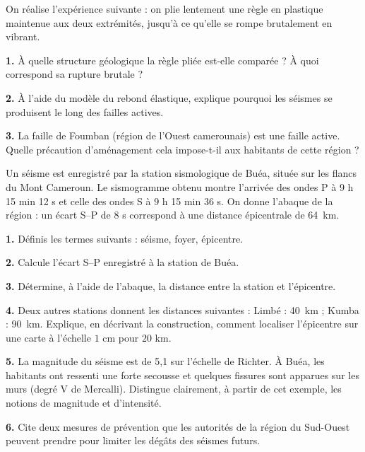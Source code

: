 \documentclass[11pt]{article}
\newcommand{\cle}[1]{{\popxbold\color{popdark}#1}}
\newcounter{popsec}
\newcounter{popsub}
\newcommand{\courssub}[1]{%
  \stepcounter{popsub}%
  \par\vspace{9pt}\noindent{\popxbold\fontsize{11.5}{13}\selectfont\color{popink}{\color{poporange}\thepopsec.\thepopsub}\hspace{6pt}#1}\par\nopagebreak\vspace{4pt}
}
\begin{document}
\begin{exercice}
On réalise l'expérience suivante : on plie lentement une règle en plastique maintenue aux deux extrémités, jusqu'à ce qu'elle se rompe brutalement en vibrant.

\textbf{1.} À quelle structure géologique la règle pliée est-elle comparée ? À quoi correspond sa rupture brutale ?

\textbf{2.} À l'aide du modèle du \cle{rebond élastique}, explique pourquoi les séismes se produisent le long des \cle{failles actives}.

\textbf{3.} La faille de Foumban (région de l'Ouest camerounais) est une faille active. Quelle précaution d'aménagement cela impose-t-il aux habitants de cette région ?
\end{exercice}

\courssub{Je me prépare au BEPC}

\begin{exercice}
Un séisme est enregistré par la station sismologique de Buéa, située sur les flancs du Mont Cameroun. Le sismogramme obtenu montre l'arrivée des ondes P à 9 h 15 min 12 s et celle des ondes S à 9 h 15 min 36 s. On donne l'abaque de la région : un écart S--P de 8 s correspond à une distance épicentrale de \SI{64}{km}.

\textbf{1.} Définis les termes suivants : séisme, foyer, épicentre.

\textbf{2.} Calcule l'écart S--P enregistré à la station de Buéa.

\textbf{3.} Détermine, à l'aide de l'abaque, la distance entre la station et l'épicentre.

\textbf{4.} Deux autres stations donnent les distances suivantes : Limbé : \SI{40}{km} ; Kumba : \SI{90}{km}. Explique, en décrivant la construction, comment localiser l'épicentre sur une carte à l'échelle $1$ cm pour $20$ km.

\textbf{5.} La magnitude du séisme est de 5,1 sur l'échelle de Richter. À Buéa, les habitants ont ressenti une forte secousse et quelques fissures sont apparues sur les murs (degré V de Mercalli). Distingue clairement, à partir de cet exemple, les notions de magnitude et d'intensité.

\textbf{6.} Cite deux mesures de prévention que les autorités de la région du Sud-Ouest peuvent prendre pour limiter les dégâts des séismes futurs.
\end{exercice}
\end{document}
